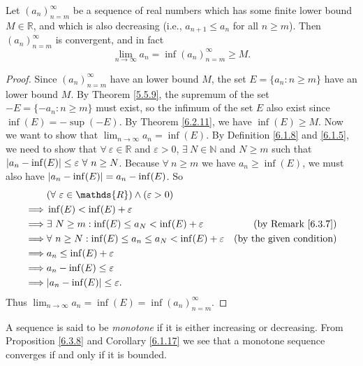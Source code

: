 \begin{additional corollary}\label{ac 6.3.1}
Let \((a_n)_{n = m}^\infty\) be a sequence of real numbers which has some finite lower bound \(M \in \mathds{R}\), and which is also decreasing (i.e., \(a_{n + 1} \leq a_n\) for all \(n \geq m\)).
Then \((a_n)_{n = m}^\infty\) is convergent, and in fact
\[
    \lim_{n \to \infty} a_n = \inf(a_n)_{n = m}^\infty \geq M.
\]
\end{additional corollary}

\begin{proof}
Since \((a_n)_{n = m}^\infty\) have an lower bound \(M\), the set \(E = \{a_n : n \geq m\}\) have an lower bound \(M\).
By Theorem \ref{5.5.9}, the supremum of the set \(-E = \{-a_n : n \geq m\}\) must exist, so the infimum of the set \(E\) also exist since \(\inf(E) = -\sup(-E)\).
By Theorem \ref{6.2.11}, we have \(\inf(E) \geq M\).
Now we want to show that \(\lim_{n \to \infty} a_n = \inf(E)\).
By Definition \ref{6.1.8} and \ref{6.1.5}, we need to show that \(\forall\ \varepsilon \in \mathds{R}\) and \(\varepsilon > 0\), \(\exists\ N \in \mathds{N}\) and \(N \geq m\) such that \(\abs*{a_n - \inf(E)} \leq \varepsilon \ \forall\ n \geq N\).
Because \(\forall\ n \geq m\) we have \(a_n \geq \inf(E)\), we must also have \(\abs*{a_n - \inf(E)} = a_n - \inf(E)\).
So
\begin{align*}
& (\forall\ \varepsilon \in \mathds{R}) \land (\varepsilon > 0) \\
\implies & \inf(E) < \inf(E) + \varepsilon \\
\implies & \exists\ N \geq m : \inf(E) \leq a_N < \inf(E) + \varepsilon & \text{(by Remark \ref{6.3.7})} \\
\implies & \forall\ n \geq N : \inf(E) \leq a_n \leq a_N < \inf(E) + \varepsilon & \text{(by the given condition)} \\
\implies & a_n \leq \inf(E) + \varepsilon \\
\implies & a_n - \inf(E) \leq \varepsilon \\
\implies & \abs*{a_n - \inf(E)} \leq \varepsilon.
\end{align*}
Thus \(\lim_{n \to \infty} a_n = \inf(E) = \inf(a_n)_{n = m}^\infty\).
\end{proof}

\begin{note}
A sequence is said to be \emph{monotone} if it is either increasing or decreasing.
From Proposition \ref{6.3.8} and Corollary \ref{6.1.17} we see that a monotone sequence converges if and only if it is bounded.
\end{note}

